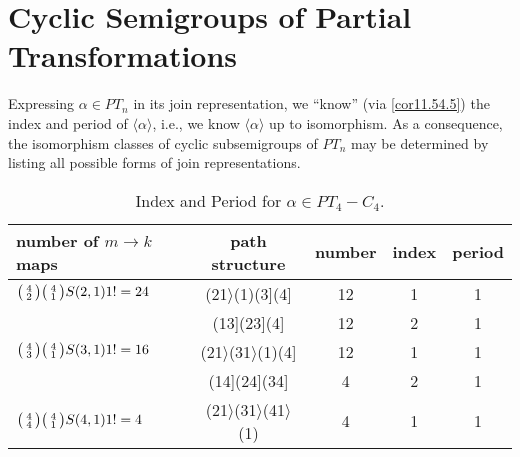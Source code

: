 \documentclass{surv-l}
\numberwithin{equation}{section}
\numberwithin{table}{section}
\numberwithin{figure}{section}
\theoremstyle{plain}
\theoremstyle{definition}
\begin{document}
\section{Cyclic Semigroups of Partial Transformations}\label{sec11.55}

Expressing $\alpha\in PT_{n}$ in its join representation, we
``know'' (via \ref{cor11.54.5}) the index and period of
$\langle\alpha\rangle$, i.e., we know $\langle\alpha\rangle$ up to
isomorphism. As a consequence, the isomorphism classes of cyclic
subsemigroups of $PT_{n}$ may be determined by listing all
possible forms of join representations.

\begin{table}[!h]
\caption{Index and Period for $\alpha\in
PT_{4}-C_{4}$.}\label{tab11.55.1}
{\begin{tabular}{|l|c|c|c|c|}
\hline
\textbf{number of} $m\rightarrow k$ \textbf{maps} &\textbf{path structure} &\textbf{number} &\textbf{index} &\textbf{period} \\
\hline
$\big(\kern0.5pt\begin{smallmatrix}4 \\ 2\end{smallmatrix}\kern0.5pt\big)\big(\kern0.5pt\begin{smallmatrix}4\\ 1\end{smallmatrix}\kern0.5pt\big)S(2,1)1!=24$ & (21$\rangle$(1)(3](4] &12 &1 &1 \\
&(13](23](4] &12 &2 &1 \\
\hline
$\big(\kern0.5pt\begin{smallmatrix}4\\ 3\end{smallmatrix}\kern0.5pt\big)\big(\kern0.5pt\begin{smallmatrix}4\\ 1\end{smallmatrix}\kern0.5pt\big)S(3,1)1!=16$ &(21$\rangle$(31$\rangle$(1)(4] &12 &1 &1 \\
&(14](24](34] &4 &2 &1 \\
\hline
$\big(\kern0.5pt\begin{smallmatrix}4\\ 4\end{smallmatrix}\kern0.5pt\big)\big(\kern0.5pt\begin{smallmatrix}4\\ 1\end{smallmatrix}\kern0.5pt\big)S(4,1)1!=4$ &(21$\rangle$(31$\rangle$(41$\rangle$(1) &4 &1 &1 \\

\end{tabular}}
\end{table}
\end{document}
